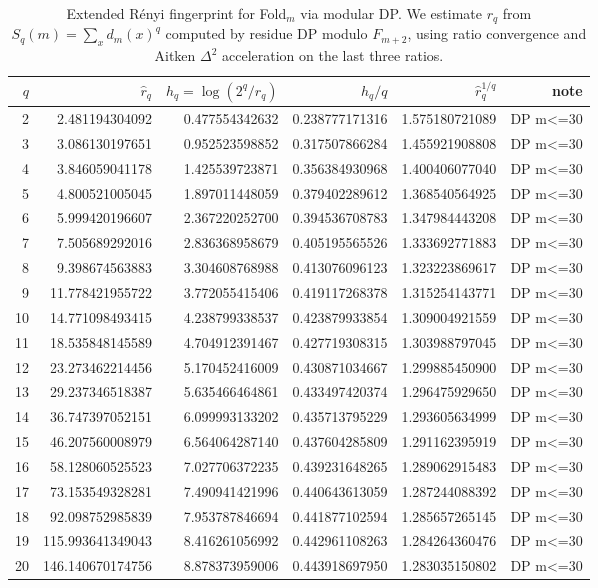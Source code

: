 \begin{table}[H]
\centering
\scriptsize
\setlength{\tabcolsep}{6pt}
\caption{Extended R\'enyi fingerprint for Fold$_m$ via modular DP. We estimate $r_q$ from $S_q(m)=\sum_x d_m(x)^q$ computed by residue DP modulo $F_{m+2}$, using ratio convergence and Aitken $\Delta^2$ acceleration on the last three ratios.}
\label{tab:fold_collision_renyi_spectrum_mod_dp_q20}
\begin{tabular}{r r r r r r}
\toprule
$q$ & $\widehat r_q$ & $h_q=\log(2^q/\widehat r_q)$ & $h_q/q$ & $\widehat r_q^{1/q}$ & note\\
\midrule
2 & 2.481194304092 & 0.477554342632 & 0.238777171316 & 1.575180721089 & DP m<=30\\
3 & 3.086130197651 & 0.952523598852 & 0.317507866284 & 1.455921908808 & DP m<=30\\
4 & 3.846059041178 & 1.425539723871 & 0.356384930968 & 1.400406077040 & DP m<=30\\
5 & 4.800521005045 & 1.897011448059 & 0.379402289612 & 1.368540564925 & DP m<=30\\
6 & 5.999420196607 & 2.367220252700 & 0.394536708783 & 1.347984443208 & DP m<=30\\
7 & 7.505689292016 & 2.836368958679 & 0.405195565526 & 1.333692771883 & DP m<=30\\
8 & 9.398674563883 & 3.304608768988 & 0.413076096123 & 1.323223869617 & DP m<=30\\
9 & 11.778421955722 & 3.772055415406 & 0.419117268378 & 1.315254143771 & DP m<=30\\
10 & 14.771098493415 & 4.238799338537 & 0.423879933854 & 1.309004921559 & DP m<=30\\
11 & 18.535848145589 & 4.704912391467 & 0.427719308315 & 1.303988797045 & DP m<=30\\
12 & 23.273462214456 & 5.170452416009 & 0.430871034667 & 1.299885450900 & DP m<=30\\
13 & 29.237346518387 & 5.635466464861 & 0.433497420374 & 1.296475929650 & DP m<=30\\
14 & 36.747397052151 & 6.099993133202 & 0.435713795229 & 1.293605634999 & DP m<=30\\
15 & 46.207560008979 & 6.564064287140 & 0.437604285809 & 1.291162395919 & DP m<=30\\
16 & 58.128060525523 & 7.027706372235 & 0.439231648265 & 1.289062915483 & DP m<=30\\
17 & 73.153549328281 & 7.490941421996 & 0.440643613059 & 1.287244088392 & DP m<=30\\
18 & 92.098752985839 & 7.953787846694 & 0.441877102594 & 1.285657265145 & DP m<=30\\
19 & 115.993641349043 & 8.416261056992 & 0.442961108263 & 1.284264360476 & DP m<=30\\
20 & 146.140670174756 & 8.878373959006 & 0.443918697950 & 1.283035150802 & DP m<=30\\
\bottomrule
\end{tabular}
\end{table}
